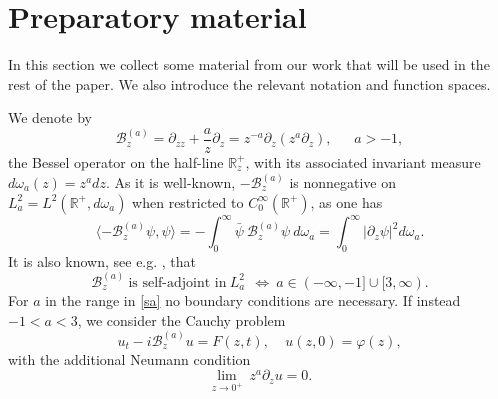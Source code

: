 \documentclass[11pt,letter]{amsart}
\def \R {\mathbb{R}}
\newcommand{\Ba}{\mathscr B_z^{(a)}}
\def \vf{\varphi}
\newcommand{\p}{\partial}
\numberwithin{equation}{section}
\newcommand{\sa}{\langle}
\newcommand{\da}{\rangle}
\numberwithin{equation}{section}
\begin{document}



\vskip 0.2in


\section{Preparatory material}\label{S:prep}

In this section we collect some material from our work \cite{GS} that will be used in the rest of the paper. We also introduce the relevant notation and function spaces.

We denote by 
\begin{equation}\label{Ba}
\mathscr B_z^{(a)} = \p_{zz}  + \frac az \p_z = z^{-a}\p_z(z^a\p_z),\ \ \ \ \ \ \ a>-1,
\end{equation}
the Bessel operator on the half-line $\R^+_z$, with its associated invariant measure $d\omega_a(z) = z^a dz$. As it is well-known,  $-\Ba$ is nonnegative on $L^2_a = L^2(\R^+, d\omega_a)$ when restricted to $C^\infty_0(\R^+)$, as one has
\begin{equation}\label{pos}
\sa -\Ba \psi,\psi\da = - \int_0^\infty \bar \psi\ \Ba \psi\  d\omega_a = \int_0^\infty |\p_z \psi|^2 d\omega_a.
\end{equation}
It is also known, see e.g. \cite{GS}, that 
\begin{equation}\label{sa}
\Ba\ \text{is self-adjoint in}\ L^2_a\ \ \Longleftrightarrow\  
a\in (-\infty,-1] \cup [3,\infty).
\end{equation}
For $a$ in the range in \eqref{sa} no boundary conditions are necessary. If instead $-1<a<3$, we consider the Cauchy problem 
\begin{equation}\label{cp0}
u_t - i \Ba u = F(z,t),\ \ \ \ \ u(z,0) = \vf(z),
\end{equation}
with the additional Neumann condition 
\begin{equation}\label{neu}
\underset{z\to 0^+}{\lim}\ z^a \p_z u = 0.
\end{equation}
\end{document}
